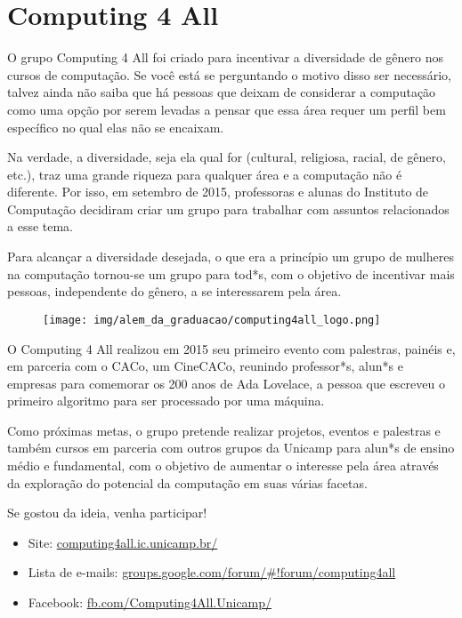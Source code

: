 
\section{Computing 4 All}

O grupo Computing 4 All foi criado para incentivar a diversidade de gênero nos
cursos de computação. Se você está se perguntando o motivo disso ser necessário,
talvez ainda não saiba que há pessoas que deixam de considerar a computação como
uma opção por serem levadas a pensar que essa área requer um perfil bem
específico no qual elas não se encaixam.

Na verdade, a diversidade, seja ela qual for (cultural, religiosa, racial, de
gênero, etc.), traz uma grande riqueza para qualquer área e a computação não é
diferente. Por isso, em setembro de 2015, professoras e alunas do Instituto de
Computação decidiram criar um grupo para trabalhar com assuntos relacionados a
esse tema.

Para alcançar a diversidade desejada, o que era a princípio um grupo de mulheres
na computação tornou-se um grupo para tod*s, com o objetivo de incentivar mais
pessoas, independente do gênero, a se interessarem pela área.

\begin{figure}[H]
    \centering
    \texttt{[image: img/alem\_da\_graduacao/computing4all\_logo.png]}
\end{figure}

O Computing 4 All realizou em 2015 seu primeiro evento com palestras, painéis e,
em parceria com o CACo, um CineCACo, reunindo professor*s, alun*s e empresas
para comemorar os 200 anos de Ada Lovelace, a pessoa que escreveu o primeiro
algoritmo para ser processado por uma máquina.

Como próximas metas, o grupo pretende realizar projetos, eventos e palestras e
também cursos em parceria com outros grupos da Unicamp para alun*s de ensino
médio e fundamental, com o objetivo de aumentar o interesse pela área através da
exploração do potencial da computação em suas várias facetas.

Se gostou da ideia, venha participar!

\begin{itemize}[noitemsep]
\item Site: \url{computing4all.ic.unicamp.br/}
\item Lista de e-mails: \url{groups.google.com/forum/\#!forum/computing4all}
\item Facebook: \url{fb.com/Computing4All.Unicamp/}
\end{itemize}

